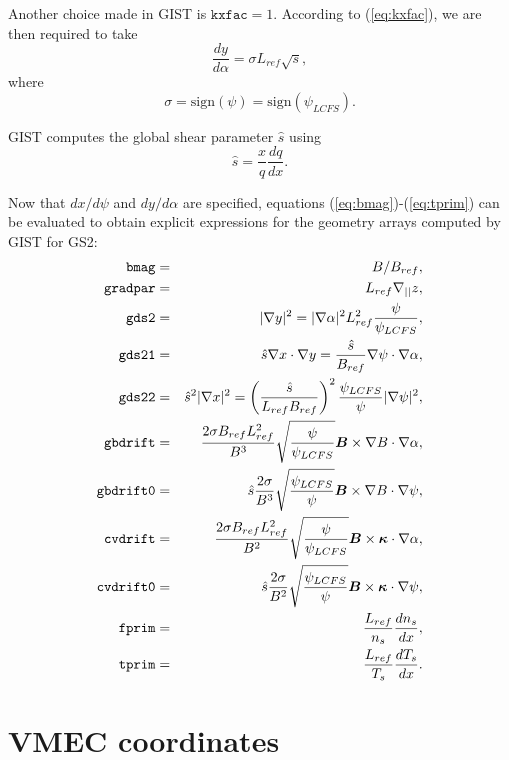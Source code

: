 \documentclass[11pt,letter]{article}
\newcommand{\vect}[1]{\mbox{\boldmath $#1$}}
\newcommand{\kxfac}{\mathtt{kxfac}}
\newcommand{\bmag}{\mathtt{bmag}}
\newcommand{\gdstwo}{\mathtt{gds2}}
\newcommand{\gdstwoone}{\mathtt{gds21}}
\newcommand{\gdstwotwo}{\mathtt{gds22}}
\newcommand{\gbdrift}{\mathtt{gbdrift}}
\newcommand{\gbdriftO}{\mathtt{gbdrift0}}
\newcommand{\cvdrift}{\mathtt{cvdrift}}
\newcommand{\cvdriftO}{\mathtt{cvdrift0}}
\newcommand{\fprim}{\mathtt{fprim}}
\newcommand{\tprim}{\mathtt{tprim}}
\newcommand{\gradpar}{\mathtt{gradpar}}
\newcommand{\sign}{\mathrm{sign}}
\begin{document}
Another choice made in GIST is $\kxfac=1$. According to (\ref{eq:kxfac}), we are then required to take 
\begin{equation}
\frac{d y}{d\alpha} = \sigma L_{ref} \sqrt{s} ,
\label{eq:dy_dalpha}
\end{equation}
where \begin{equation}
\sigma = \sign(\psi) = \sign(\psi_{LCFS}).
\end{equation}

GIST computes the global shear parameter $\hat{s}$ using
\begin{equation}
\hat{s} = \frac{x}{q} \frac{dq}{dx}.
\end{equation}

Now that $dx/d\psi$ and $dy/d\alpha$ are specified, equations (\ref{eq:bmag})-(\ref{eq:tprim}) 
can be evaluated to obtain explicit expressions for the geometry arrays computed by GIST for GS2:
\begin{eqnarray}
\bmag &=& B/B_{ref}, \label{eq:gist_Bref}\\
\gradpar &=& L_{ref} \nabla_{||} z, \\
\gdstwo &=& |\nabla y|^2 = |\nabla\alpha|^2 L_{ref}^2 \frac{\psi}{\psi_{LCFS}}, \\
\gdstwoone &=& \hat{s} \nabla x \cdot \nabla y = \frac{\hat{s}}{B_{ref}} \nabla\psi\cdot\nabla\alpha , \\
\gdstwotwo &=& \hat{s}^2|\nabla x |^2  = \left( \frac{\hat{s}}{L_{ref} B_{ref}}\right)^2 \frac{\psi_{LCFS}}{\psi} |\nabla\psi |^2, \\
\gbdrift &=& \frac{2 \sigma B_{ref} L_{ref}^2}{B^3} \sqrt{\frac{\psi}{\psi_{LCFS}}} \vect{B}\times\nabla B\cdot \nabla \alpha, \\
\gbdriftO &=& \hat{s} \frac{2 \sigma}{B^3}   \sqrt{\frac{\psi_{LCFS}}{\psi}} \vect{B}\times\nabla B\cdot \nabla \psi, \\
\cvdrift &=& \frac{2 \sigma B_{ref} L_{ref}^2}{B^2} \sqrt{\frac{\psi}{\psi_{LCFS}}} \vect{B}\times\vect{\kappa} \cdot \nabla \alpha, \\
\cvdriftO &=& \hat{s} \frac{2 \sigma}{B^2}  \sqrt{\frac{\psi_{LCFS}}{\psi}} \vect{B}\times\vect{\kappa} \cdot \nabla \psi,  \label{eq:gist_cvdrift0} \\
\fprim &=&   \frac{L_{ref}}{n_s} \frac{d n_s}{d x}, \\
\tprim &=&   \frac{L_{ref}}{T_s} \frac{d T_s}{d x}. 
\end{eqnarray}

\section{VMEC coordinates}
\end{document}
